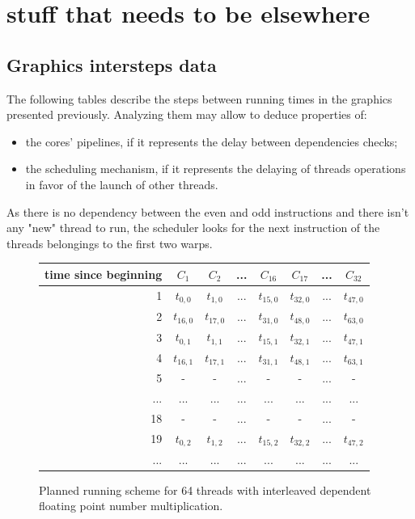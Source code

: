 \documentclass{report}
\begin{document}
   
  \appendix 
   
\chapter{stuff that needs to be elsewhere}
    \section{Graphics intersteps data}
    The following tables describe the steps between running times in the graphics presented previously. Analyzing them may allow to deduce properties of: 
    \begin{itemize} 
        \item the cores' pipelines, if it represents the delay between dependencies checks;
        \item the scheduling mechanism, if it represents the delaying of threads operations in favor of the launch of other threads.
    \end{itemize}
    
    \centering
    
    
    \pagebreak
    

As there is no dependency between the even and odd instructions and there isn't any "new" thread to run, the scheduler looks for the next instruction of the threads belongings to the first two warps.
\begin{figure}[H]
      \centering
       \begin{tabular}{ | r || c | c | c | c || c | c | c | }
    	    \hline
    	    time since beginning & $C_1$ & $C_2$ & ... & $C_{16}$ & $C_{17}$ & ... & $C_{32}$ \\ \hline  \hline
    	   1 & $t_{0,0}$ & $t_{1,0}$ & ... & $t_{15,0}$ & $t_{32, 0}$ & ... & $t_{47, 0}$ \\ \hline 
    	   2 & $t_{16,0}$ & $t_{17,0}$ & ... & $t_{31,0}$ & $t_{48, 0}$ & ... & $t_{63, 0}$ \\ \hline
    	   3 & $t_{0,1}$ & $t_{1,1}$ & ... & $t_{15,1}$ & $t_{32, 1}$ & ... & $t_{47, 1}$ \\ \hline
           4 & $t_{16,1}$ & $t_{17,1}$ & ... & $t_{31,1}$ & $t_{48, 1}$ & ... & $t_{63, 1}$ \\ \hline
    	   5 & - & - & ... & - & - & ... & - \\ \hline
    	   ... & ... & ... & ... & ... & ... & ... & ... \\ \hline
    	   18 & - & - & ... & - & - & ... & - \\ \hline
    	   19 & $t_{0,2}$ & $t_{1,2}$ & ... & $t_{15,2}$ & $t_{32,2}$ & ... & $t_{47,2}$ \\ \hline
    	   ... & ... & ... & ... & ... & ... & ... & ... \\ \hline
  	\end{tabular}
  	\captionsetup{justification=centering}
  	\caption{Planned running scheme for 64 threads with interleaved dependent floating point number multiplication.}
  	\label{fig:fp_prediction_64_halfdep}
   \end{figure}
   
   {}
   
\end{document}
